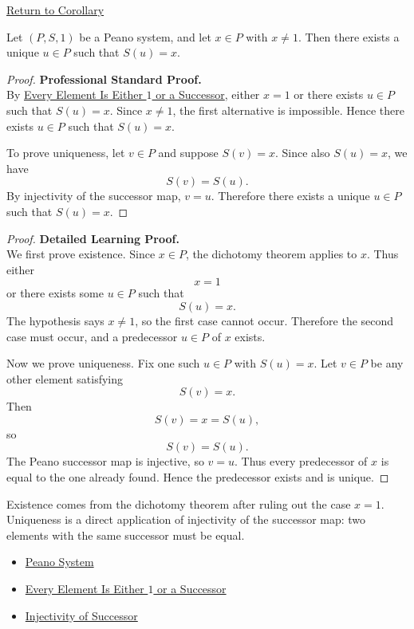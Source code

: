 \newpage
{}
\label{prf:predecessor-exists-unique-away-from-one}

\begin{remark*}[Return]
\hyperref[cor:predecessor-exists-unique-away-from-one]{Return to Corollary}
\end{remark*}

\begin{corollary*}
Let $(P,S,1)$ be a Peano system, and let $x \in P$ with $x \neq 1$. Then
there exists a unique $u \in P$ such that $S(u)=x$.
\end{corollary*}

\begin{proof}
\textbf{Professional Standard Proof.}~\\
By
\hyperref[thm:every-element-is-one-or-a-successor]{Every Element Is Either
$1$ or a Successor}, either $x=1$ or there exists $u\in P$ such that
$S(u)=x$. Since $x\neq 1$, the first alternative is impossible. Hence there
exists $u\in P$ such that $S(u)=x$.

To prove uniqueness, let $v\in P$ and suppose $S(v)=x$. Since also $S(u)=x$,
we have
\[
S(v)=S(u).
\]
By injectivity of the successor map, $v=u$. Therefore there exists a unique
$u\in P$ such that $S(u)=x$.
\end{proof}

\begin{proof}
\textbf{Detailed Learning Proof.}~\\
We first prove existence. Since $x\in P$, the dichotomy theorem applies to
$x$. Thus either
\[
x=1
\]
or there exists some $u\in P$ such that
\[
S(u)=x.
\]
The hypothesis says $x\neq 1$, so the first case cannot occur. Therefore the
second case must occur, and a predecessor $u\in P$ of $x$ exists.

Now we prove uniqueness. Fix one such $u\in P$ with $S(u)=x$. Let
$v\in P$ be any other element satisfying
\[
S(v)=x.
\]
Then
\[
S(v)=x=S(u),
\]
so
\[
S(v)=S(u).
\]
The Peano successor map is injective, so $v=u$. Thus every predecessor of
$x$ is equal to the one already found. Hence the predecessor exists and is
unique.
\end{proof}

\begin{remark*}
Existence comes from the dichotomy theorem after ruling out the case $x=1$.
Uniqueness is a direct application of injectivity of the successor map: two
elements with the same successor must be equal.
\end{remark*}

\begin{dependencies}
\begin{itemize}
  \item \hyperref[def:peano-system]{Peano System}
  \item \hyperref[thm:every-element-is-one-or-a-successor]{Every Element Is Either $1$ or a Successor}
  \item \hyperref[ax:peano-successor-injective]{Injectivity of Successor}
\end{itemize}
\end{dependencies}

